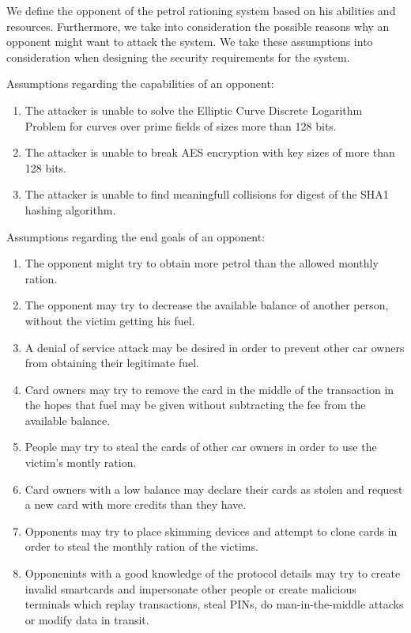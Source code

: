 We define the opponent of the petrol rationing system based on his abilities and resources. Furthermore, we take into consideration the possible reasons why an opponent might want to attack the system. We take these assumptions into consideration when designing the security requirements for the system.

Assumptions regarding the capabilities of an opponent:
\begin{enumerate}
	\item The attacker is unable to solve the Elliptic Curve Discrete Logarithm Problem for curves over prime fields of sizes more than 128 bits.
	\item The attacker is unable to break AES encryption with key sizes of more than 128 bits.
	\item The attacker is unable to find meaningfull collisions for digest of the SHA1 hashing algorithm.
\end{enumerate}

Assumptions regarding the end goals of an opponent:
\begin{enumerate}
	\item The opponent might try to obtain more petrol than the allowed monthly ration.
	\item The opponent may try to decrease the available balance of another person, without the victim getting his fuel.
	\item A denial of service attack may be desired in order to prevent other car owners from obtaining their legitimate fuel.
	\item Card owners may try to remove the card in the middle of the transaction in the hopes that fuel may be given without subtracting the fee from the available balance.
	\item People may try to steal the cards of other car owners in order to use the victim's montly ration.
	\item Card owners with a low balance may declare their cards as stolen and request a new card with more credits than they have.
	\item Opponents may try to place skimming devices and attempt to clone cards in order to steal the monthly ration of the victims.
	\item Opponenints with a good knowledge of the protocol details may try to create invalid smartcards and impersonate other people or create malicious terminals which replay transactions, steal PINs, do man-in-the-middle attacks or modify data in transit.
\end{enumerate}